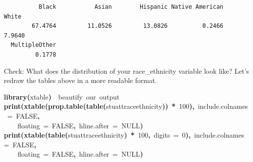 \documentclass[12pt]{article}
\makeatletter
\newcommand{\hlnumber}[1]{\textcolor[rgb]{0,0,0}{#1}}%
\newcommand{\hlfunctioncall}[1]{\textcolor[rgb]{0.501960784313725,0,0.329411764705882}{\textbf{#1}}}%
\newcommand{\hlkeyword}[1]{\textcolor[rgb]{0,0,0}{\textbf{#1}}}%
\newcommand{\hlargument}[1]{\textcolor[rgb]{0.690196078431373,0.250980392156863,0.0196078431372549}{#1}}%
\newcommand{\hlcomment}[1]{\textcolor[rgb]{0.180392156862745,0.6,0.341176470588235}{#1}}%
\newcommand{\hlsymbol}[1]{\textcolor[rgb]{0,0,0}{#1}}%
\newcommand{\hlstd}[1]{\textcolor[rgb]{0,0,0}{#1}}%
\newenvironment{kframe}{%
 \def\FrameCommand##1{\hskip\@totalleftmargin \hskip-\fboxsep
 \colorbox{shadecolor}{##1}\hskip-\fboxsep
     \hskip-\linewidth \hskip-\@totalleftmargin \hskip\columnwidth}%
 \MakeFramed {\advance\hsize-\width
   \@totalleftmargin\z@ \linewidth\hsize
   \@setminipage}}%
 {\par\unskip\endMakeFramed}
\newenvironment{knitrout}{}{} %
\renewenvironment{knitrout}{\begin{footnotesize}}{\end{footnotesize}}
\makeatother
\begin{document}
\begin{knitrout}
\begin{kframe}
\begin{verbatim}
          Black           Asian        Hispanic Native American           White 
        67.4764         11.0526         13.0826          0.2466          7.9640 
  MultipleOther 
         0.1778 
\end{verbatim}
\end{kframe}
\end{knitrout}


Check:  What does the distribution of your race\_ethnicity variable look like? Let's redraw the tables above in a more readable format.

\begin{knitrout}
\color{fgcolor}\begin{kframe}
\begin{flushleft}
\ttfamily\noindent
\hlfunctioncall{library}\hlkeyword{(}\hlsymbol{xtable}\hlkeyword{)}{\ }{\ }\hlcomment{\usebox{\hlnormalsizeboxhash}beautify{\ }our{\ }output}\hspace*{\fill}\\
\hlstd{}\hlfunctioncall{print}\hlkeyword{(}\hlfunctioncall{xtable}\hlkeyword{(}\hlfunctioncall{prop.table}\hlkeyword{(}\hlfunctioncall{table}\hlkeyword{(}\hlsymbol{stuatt}\hlkeyword{\usebox{\hlnormalsizeboxdollar}}\hlsymbol{race\usebox{\hlnormalsizeboxunderscore}ethnicity}\hlkeyword{)}\hlkeyword{)}{\ }\hlkeyword{*}{\ }\hlnumber{100}\hlkeyword{)}\hlkeyword{,}{\ }\hlargument{include.colnames}{\ }\hlargument{=}{\ }\hlnumber{FALSE}\hlkeyword{,}\hspace*{\fill}\\
\hlstd{}{\ }{\ }{\ }{\ }\hlargument{floating}{\ }\hlargument{=}{\ }\hlnumber{FALSE}\hlkeyword{,}{\ }\hlargument{hline.after}{\ }\hlargument{=}{\ }NULL\hlkeyword{)}\hspace*{\fill}\\
\hlstd{}\hlfunctioncall{print}\hlkeyword{(}\hlfunctioncall{xtable}\hlkeyword{(}\hlfunctioncall{table}\hlkeyword{(}\hlsymbol{stuatt}\hlkeyword{\usebox{\hlnormalsizeboxdollar}}\hlsymbol{race\usebox{\hlnormalsizeboxunderscore}ethnicity}\hlkeyword{)}{\ }\hlkeyword{*}{\ }\hlnumber{100}\hlkeyword{,}{\ }\hlargument{digits}{\ }\hlargument{=}{\ }\hlnumber{0}\hlkeyword{)}\hlkeyword{,}{\ }\hlargument{include.colnames}{\ }\hlargument{=}{\ }\hlnumber{FALSE}\hlkeyword{,}\hspace*{\fill}\\
\hlstd{}{\ }{\ }{\ }{\ }\hlargument{floating}{\ }\hlargument{=}{\ }\hlnumber{FALSE}\hlkeyword{,}{\ }\hlargument{hline.after}{\ }\hlargument{=}{\ }NULL\hlkeyword{)}\mbox{}
\normalfont
\end{flushleft}
\end{kframe}
\end{knitrout}
\end{document}
